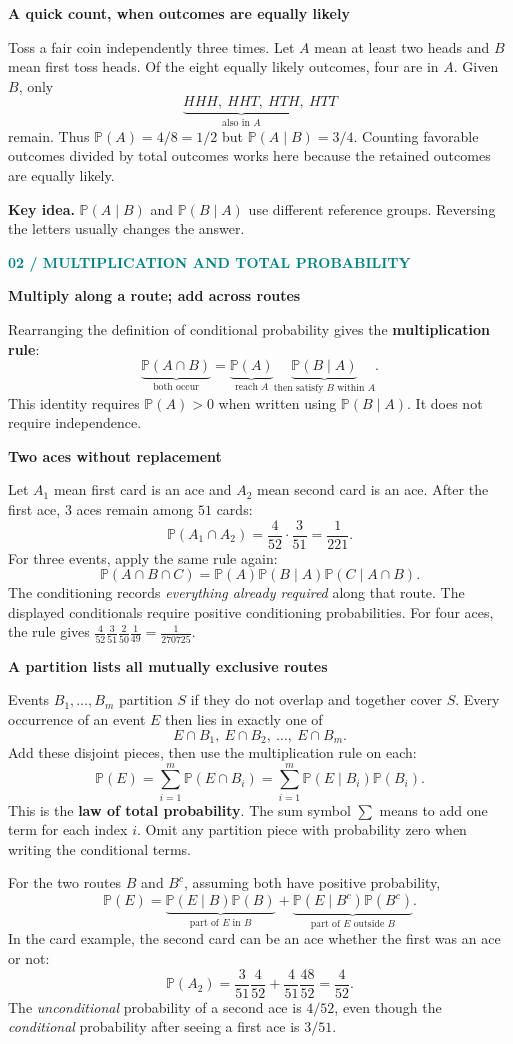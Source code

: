 \documentclass[11pt,letterpaper]{article}
\newcommand{\Pp}{\mathbb{P}}
\newcommand{\sectionpage}[2]{\textcolor{teal}{\small\textbf{#1}}\par{\LARGE\bfseries\color{ink}#2}\par\medskip}
\newcommand{\takeaway}[1]{\par\smallskip\noindent\colorbox{pale}{\parbox{\dimexpr\linewidth-2\fboxsep\relax}{\textbf{Key idea.} #1}}\par\smallskip}
\newcommand{\minihead}[1]{\par\smallskip\textbf{\color{ink}#1}\par}
\begin{document}
\minihead{A quick count, when outcomes are equally likely}
Toss a fair coin independently three times. Let $A$ mean at least two heads and $B$ mean first toss heads. Of the eight equally likely outcomes, four are in $A$. Given $B$, only
\[
\underbrace{HHH,\ HHT,\ HTH}_{\text{also in }A},\ HTT
\]
remain. Thus $\Pp(A)=4/8=1/2$ but $\Pp(A\mid B)=3/4$. Counting favorable outcomes divided by total outcomes works here because the retained outcomes are equally likely.

\takeaway{$\Pp(A\mid B)$ and $\Pp(B\mid A)$ use different reference groups. Reversing the letters usually changes the answer.}

\newpage
\sectionpage{02 / MULTIPLICATION AND TOTAL PROBABILITY}{Multiply along a route; add across routes}
Rearranging the definition of conditional probability gives the \textbf{multiplication rule}:
\[
\underbrace{\Pp(A\cap B)}_{\text{both occur}}
=\underbrace{\Pp(A)}_{\text{reach }A}
\underbrace{\Pp(B\mid A)}_{\text{then satisfy }B\text{ within }A}.
\]
This identity requires $\Pp(A)>0$ when written using $\Pp(B\mid A)$. It does not require independence.

\minihead{Two aces without replacement}
Let $A_1$ mean first card is an ace and $A_2$ mean second card is an ace. After the first ace, $3$ aces remain among $51$ cards:
\[
\Pp(A_1\cap A_2)=\frac4{52}\cdot\frac3{51}=\frac1{221}.
\]
For three events, apply the same rule again:
\[
\Pp(A\cap B\cap C)=\Pp(A)\Pp(B\mid A)\Pp(C\mid A\cap B).
\]
The conditioning records \emph{everything already required} along that route. The displayed conditionals require positive conditioning probabilities. For four aces, the rule gives
$\frac4{52}\frac3{51}\frac2{50}\frac1{49}=\frac1{270725}$.

\minihead{A partition lists all mutually exclusive routes}
Events $B_1,\ldots,B_m$ partition $S$ if they do not overlap and together cover $S$. Every occurrence of an event $E$ then lies in exactly one of
\[
E\cap B_1,\ E\cap B_2,\ \ldots,\ E\cap B_m.
\]
Add these disjoint pieces, then use the multiplication rule on each:
\[
\boxed{\Pp(E)=\sum_{i=1}^{m}\Pp(E\cap B_i)
=\sum_{i=1}^{m}\Pp(E\mid B_i)\Pp(B_i).}
\]
This is the \textbf{law of total probability}. The sum symbol $\sum$ means to add one term for each index $i$. Omit any partition piece with probability zero when writing the conditional terms.

For the two routes $B$ and $B^c$, assuming both have positive probability,
\[
\Pp(E)=\underbrace{\Pp(E\mid B)\Pp(B)}_{\text{part of }E\text{ in }B}
+\underbrace{\Pp(E\mid B^c)\Pp(B^c)}_{\text{part of }E\text{ outside }B}.
\]
In the card example, the second card can be an ace whether the first was an ace or not:
\[
\Pp(A_2)=\frac3{51}\frac4{52}+\frac4{51}\frac{48}{52}=\frac4{52}.
\]
The \emph{unconditional} probability of a second ace is $4/52$, even though the \emph{conditional} probability after seeing a first ace is $3/51$.
\end{document}
